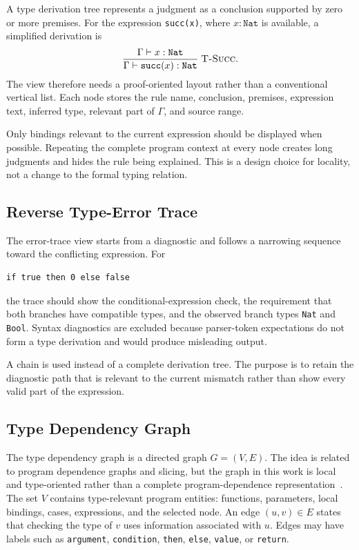 A type derivation tree represents a judgment as a conclusion supported by zero or more premises. For the expression \texttt{succ(x)}, where $x:\texttt{Nat}$ is available, a simplified derivation is
\[
\frac{\Gamma \vdash x : \texttt{Nat}}
     {\Gamma \vdash \texttt{succ}(x) : \texttt{Nat}}
\;\textsc{T-Succ}.
\]
The view therefore needs a proof-oriented layout rather than a conventional vertical list. Each node stores the rule name, conclusion, premises, expression text, inferred type, relevant part of $\Gamma$, and source range.

Only bindings relevant to the current expression should be displayed when possible. Repeating the complete program context at every node creates long judgments and hides the rule being explained. This is a design choice for locality, not a change to the formal typing relation.

\subsection{Reverse Type-Error Trace}

The error-trace view starts from a diagnostic and follows a narrowing sequence toward the conflicting expression. For
\begin{verbatim}
if true then 0 else false
\end{verbatim}
the trace should show the conditional-expression check, the requirement that both branches have compatible types, and the observed branch types \texttt{Nat} and \texttt{Bool}. Syntax diagnostics are excluded because parser-token expectations do not form a type derivation and would produce misleading output.

A chain is used instead of a complete derivation tree. The purpose is to retain the diagnostic path that is relevant to the current mismatch rather than show every valid part of the expression.

\subsection{Type Dependency Graph}

The type dependency graph is a directed graph $G=(V,E)$. The idea is related to program dependence graphs and slicing, but the graph in this work is local and type-oriented rather than a complete program-dependence representation~\cite{Ferrante1987PDG,Weiser1981Slicing,Horwitz1990Slicing}. The set $V$ contains type-relevant program entities: functions, parameters, local bindings, cases, expressions, and the selected node. An edge $(u,v)\in E$ states that checking the type of $v$ uses information associated with $u$. Edges may have labels such as \texttt{argument}, \texttt{condition}, \texttt{then}, \texttt{else}, \texttt{value}, or \texttt{return}.

